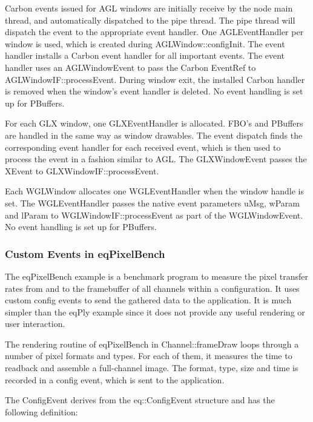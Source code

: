 \documentclass[10pt,a4]{scrartcl}
\begin{document}
Carbon events issued for AGL windows are initially receive by the node
main thread, and automatically dispatched to the pipe thread. The pipe
thread will dispatch the event to the appropriate event handler. One
\textsf{AGLEventHandler} per window is used, which is created during
\textsf{AGLWindow::configInit}. The event handler installs a Carbon
event handler for all important events. The event handler uses an
\textsf{AGLWindowEvent} to pass the Carbon \textsf{EventRef} to
\textsf{AGLWindowIF::processEvent}. During window exit, the installed
Carbon handler is removed when the window's event handler is deleted. No
event handling is set up for PBuffers.

For each GLX window, one \textsf{GLXEventHandler} is allocated. FBO's and
PBuffers are handled in the same way as window drawables. The event dispatch
finds the corresponding event handler for each received event, which is then
used to process the event in a fashion similar to AGL. The
\textsf{GLXWindowEvent} passes the \textsf{XEvent} to
\textsf{GLXWindowIF::\-process\-Event}.

Each \textsf{WGLWindow} allocates one \textsf{WGLEventHandler} when the
window handle is set. The WGLEventHandler passes the native event
parameters \textsf{uMsg}, \textsf{wParam} and \textsf{lParam} to
\textsf{WGL\-Win\-dowIF::processEvent} as part of the
\textsf{WGLWindowEvent}. No event handling is set up for PBuffers.

\subsubsection{Custom Events in eqPixelBench}

The \textsf{eqPixelBench} example is a benchmark program to measure the
pixel transfer rates from and to the framebuffer of all channels within
a configuration. It uses custom config events to send the gathered data
to the application. It is much simpler than the \textsf{eqPly} example
since it does not provide any useful rendering or user interaction.

The rendering routine of \textsf{eqPixelBench} in
\textsf{Channel::frameDraw} loops through a number of pixel formats and
types. For each of them, it measures the time to readback and assemble a
full-channel image. The format, type, size and time is recorded in a
config event, which is sent to the application.

The \textsf{ConfigEvent} derives from the \textsf{eq::ConfigEvent}
structure and has the following definition:
\end{document}
